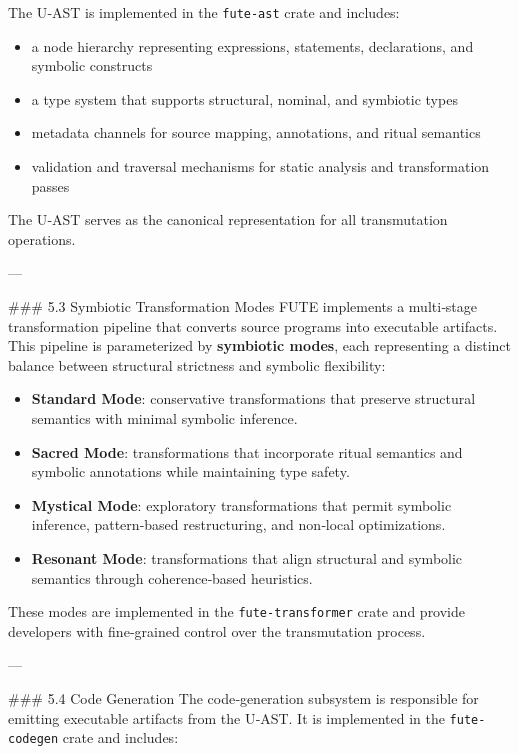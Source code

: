 \documentclass[12pt, a4paper]{book}
\begin{document}
The U‑AST is implemented in the \texttt{fute-ast} crate and includes:

\begin{itemize}
  \item a node hierarchy representing expressions, statements, declarations, and symbolic constructs  
  \item a type system that supports structural, nominal, and symbiotic types  
  \item metadata channels for source mapping, annotations, and ritual semantics  
  \item validation and traversal mechanisms for static analysis and transformation passes  
\end{itemize}

The U‑AST serves as the canonical representation for all transmutation operations.

---

\#\#\# 5.3 Symbiotic Transformation Modes  
FUTE implements a multi‑stage transformation pipeline that converts source programs into executable artifacts. This pipeline is parameterized by \textbf{symbiotic modes}, each representing a distinct balance between structural strictness and symbolic flexibility:

\begin{itemize}
  \item \textbf{Standard Mode}: conservative transformations that preserve structural semantics with minimal symbolic inference.  
  \item \textbf{Sacred Mode}: transformations that incorporate ritual semantics and symbolic annotations while maintaining type safety.  
  \item \textbf{Mystical Mode}: exploratory transformations that permit symbolic inference, pattern‑based restructuring, and non‑local optimizations.  
  \item \textbf{Resonant Mode}: transformations that align structural and symbolic semantics through coherence‑based heuristics.
\end{itemize}

These modes are implemented in the \texttt{fute-transformer} crate and provide developers with fine‑grained control over the transmutation process.

---

\#\#\# 5.4 Code Generation  
The code‑generation subsystem is responsible for emitting executable artifacts from the U‑AST. It is implemented in the \texttt{fute-codegen} crate and includes:
\end{document}
